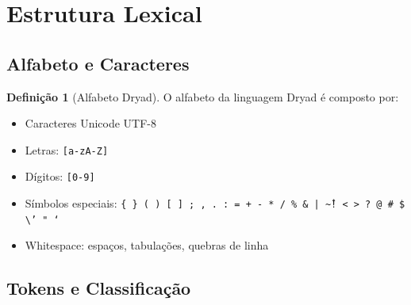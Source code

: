 \documentclass[12pt,a4paper]{article}
\theoremstyle{definition}
\newtheorem{definition}{Definição}[section]
\begin{document}
\section{Estrutura Lexical}

\subsection{Alfabeto e Caracteres}

\begin{definition}[Alfabeto Dryad]
O alfabeto da linguagem Dryad é composto por:
\begin{itemize}
    \item Caracteres Unicode UTF-8
    \item Letras: \texttt{[a-zA-Z]}
    \item Dígitos: \texttt{[0-9]}
    \item Símbolos especiais: \texttt{\{ \} ( ) [ ] ; , . : = + - * / \% \& | \^ \textasciitilde ! < > ? @ \# \$ \textbackslash ' " `}
    \item Whitespace: espaços, tabulações, quebras de linha
\end{itemize}
\end{definition}

\subsection{Tokens e Classificação}
\end{document}
